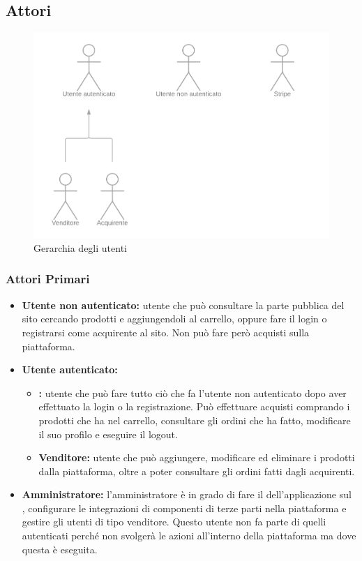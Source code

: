 \subsection{Attori} \label{Attori}

\begin{figure}[ht]
    \centering
    \includegraphics[width=\textwidth]{Immagini/DiagrammiUC/Attori.png}
    \caption{Gerarchia degli utenti} 
    \label{fig:Registrazione}
\end{figure}

\subsubsection{Attori Primari}
\begin{itemize}
    \item \textbf{Utente non autenticato:} utente che può consultare la parte pubblica del sito cercando prodotti e aggiungendoli al carrello, oppure fare il login o registrarsi come acquirente al sito. Non può fare però acquisti sulla piattaforma.
    \item \textbf{Utente autenticato:}
    \begin{itemize}
        \item \textbf{:} utente che può fare tutto ciò che fa l'utente non autenticato dopo aver effettuato la login o la registrazione. Può effettuare acquisti comprando i prodotti che ha nel carrello, consultare gli ordini che ha fatto, modificare il suo profilo e eseguire il logout.
        \item \textbf{Venditore:} utente che può aggiungere, modificare ed eliminare i prodotti dalla piattaforma, oltre a poter consultare gli ordini fatti dagli acquirenti.
    \end{itemize}
    \item \textbf{Amministratore:} l'amministratore è in grado di fare il  dell'applicazione sul , configurare le integrazioni di componenti di terze parti nella piattaforma e gestire gli utenti di tipo venditore. Questo utente non fa parte di quelli autenticati perché non svolgerà le azioni all'interno della piattaforma ma dove questa è eseguita.
\end{itemize}
